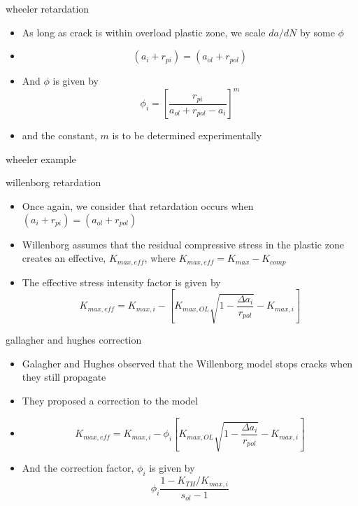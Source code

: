 \documentclass[10pt]{beamer}
\begin{document}
\begin{frame}{wheeler retardation}
	\begin{itemize}[<+->]
		\item As long as crack is within overload plastic zone, we scale $da/dN$ by some $\phi$
		\item[] \begin{equation}
		(a_i + r_{pi}) = (a_{ol} + r_{pol})
		\end{equation}
		\item And $\phi$ is given by
		\begin{equation}
		\phi_i = \left[\frac{r_{pi}}{a_{ol}+r_{pol}-a_i}\right]^m
		\end{equation}
		\item and the constant, $m$ is to be determined experimentally
	\end{itemize}
\end{frame}

\begin{frame}{wheeler example}
	
\end{frame}

\begin{frame}{willenborg retardation}
	\begin{itemize}[<+->]
		\item Once again, we consider that retardation occurs when $(a_i + r_{pi}) = (a_{ol} + r_{pol})$
		\item Willenborg assumes that the residual compressive stress in the plastic zone creates an effective, $K_{max,eff}$, where $K_{max,eff} = K_{max} - K_{comp}$
		\item The effective stress intensity factor is given by
		\begin{equation}
		K_{max,eff} = K_{max,i} - \left[K_{max,OL}\sqrt{1-\frac{\Delta a_i}{r_{pol}}} - K_{max,i} \right]
		\end{equation} 
	\end{itemize}
\end{frame}

\begin{frame}{gallagher and hughes correction}
	\begin{itemize}[<+->]
		\item Galagher and Hughes observed that the Willenborg model stops cracks when they still propagate
		\item They proposed a correction to the model
		\item[] \begin{equation}
		K_{max,eff} = K_{max,i} - \phi_i\left[K_{max,OL}\sqrt{1-\frac{\Delta a_i}{r_{pol}}} - K_{max,i} \right]
		\end{equation} 
		\item And the correction factor, $\phi_i$ is given by
		\begin{equation}
		\phi_i \frac{1-K_{TH}/K_{max,i}}{s_{ol}-1}
		\end{equation}
	\end{itemize}
\end{frame}
\end{document}
